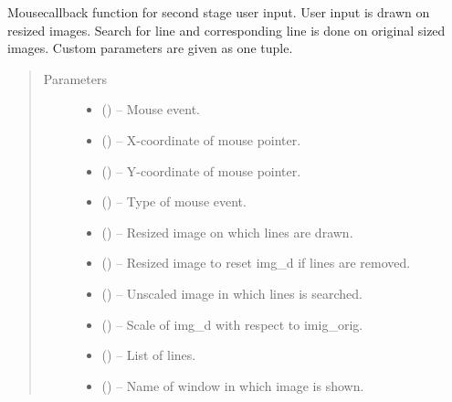 \documentclass[letterpaper,10pt,english]{sphinxmanual}
\begin{document}
\begin{fulllineitems}
\label{\detokenize{aaap_re_photo:aaap_re_photo.onMouse_stage_two}}
Mousecallback function for second stage user input.
User input is drawn on resized images. Search for line and corresponding
line is done on original sized images.
Custom parameters are given as one tuple.
\begin{quote}\begin{description}
\item[{Parameters}] \leavevmode\begin{itemize}
\item {} 
 () -- Mouse event.

\item {} 
 () -- X-coordinate of mouse pointer.

\item {} 
 () -- Y-coordinate of mouse pointer.

\item {} 
 () -- Type of mouse event.

\item {} 
 () -- Resized image on which lines are drawn.

\item {} 
 () -- Resized image to reset img\_d if lines are removed.

\item {} 
 () -- Unscaled image in which lines is searched.

\item {} 
 () -- Scale of img\_d with respect to imig\_orig.

\item {} 
 () -- List of lines.

\item {} 
 () -- Name of window in which image is shown.


\end{itemize}
\end{description}
\end{quote}
\end{fulllineitems}
\end{document}
